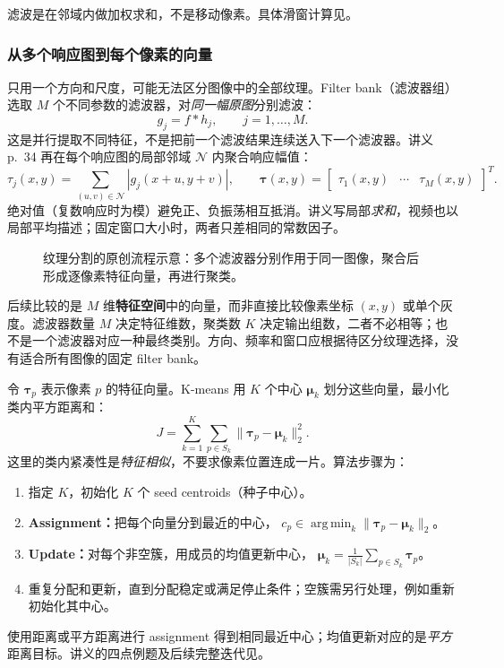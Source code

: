 滤波是在邻域内做加权求和，不是移动像素。具体滑窗计算见。

\subsubsection*{从多个响应图到每个像素的向量}

只用一个方向和尺度，可能无法区分图像中的全部纹理。Filter bank（滤波器组）选取 $M$ 个不同参数的滤波器，对\emph{同一幅原图}分别滤波：
\[
  g_j=f*h_j,\qquad j=1,\ldots,M.
\]
这是并行提取不同特征，不是把前一个滤波结果连续送入下一个滤波器。讲义 p.~34 再在每个响应图的局部邻域 $\mathcal N$ 内聚合响应幅值：
\[
  \tau_j(x,y)=\sum_{(u,v)\in\mathcal N}|g_j(x+u,y+v)|,\qquad
  \bm\tau(x,y)=\begin{bmatrix}\tau_1(x,y)&\cdots&\tau_M(x,y)\end{bmatrix}^{\!T}.
\]
绝对值（复数响应时为模）避免正、负振荡相互抵消。讲义写局部\emph{求和}，视频也以局部平均描述；固定窗口大小时，两者只差相同的常数因子。

\begin{figure}[htbp]
  \centering
  \resizebox{0.98\textwidth}{!}{}
  \caption{纹理分割的原创流程示意：多个滤波器分别作用于同一图像，聚合后形成逐像素特征向量，再进行聚类。}
  \label{fig:sc4061-l08-texture}
\end{figure}

后续比较的是 $M$ 维\textbf{特征空间}中的向量，而非直接比较像素坐标 $(x,y)$ 或单个灰度。滤波器数量 $M$ 决定特征维数，聚类数 $K$ 决定输出组数，二者不必相等；也不是一个滤波器对应一种最终类别。方向、频率和窗口应根据待区分纹理选择，没有适合所有图像的固定 filter bank。


令 $\bm\tau_p$ 表示像素 $p$ 的特征向量。K-means 用 $K$ 个中心 $\bm\mu_k$ 划分这些向量，最小化类内平方距离和：
\[
  \boxed{J=\sum_{k=1}^{K}\sum_{p\in S_k}\|\bm\tau_p-\bm\mu_k\|_2^2}.
\]
这里的类内紧凑性是\emph{特征相似}，不要求像素位置连成一片。算法步骤为：
\begin{enumerate}
  \item 指定 $K$，初始化 $K$ 个 seed centroids（种子中心）。
  \item \textbf{Assignment：}把每个向量分到最近的中心，
  $c_p\in\operatorname*{arg\,min}_k\|\bm\tau_p-\bm\mu_k\|_2$。
  \item \textbf{Update：}对每个非空簇，用成员的均值更新中心，
  $\displaystyle\bm\mu_k=\frac{1}{|S_k|}\sum_{p\in S_k}\bm\tau_p$。
  \item 重复分配和更新，直到分配稳定或满足停止条件；空簇需另行处理，例如重新初始化其中心。
\end{enumerate}
使用距离或平方距离进行 assignment 得到相同最近中心；均值更新对应的是\emph{平方}距离目标。讲义的四点例题及后续完整迭代见。

